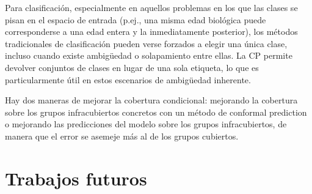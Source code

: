 Para clasificación, especialmente en aquellos problemas en los que las clases se pisan en el espacio de entrada (p.ej., una misma edad biológica puede corresponderse a una edad entera y la inmediatamente posterior), los métodos tradicionales de clasificación pueden verse forzados a elegir una única clase, incluso cuando existe ambigüedad o solapamiento entre ellas. La CP permite devolver conjuntos de clases en lugar de una sola etiqueta, lo que es particularmente útil en estos escenarios de ambigüedad inherente.

Hay dos maneras de mejorar la cobertura condicional: mejorando la cobertura sobre los grupos infracubiertos concretos con un método de conformal prediction o mejorando las predicciones del modelo sobre los grupos infracubiertos, de manera que el error se asemeje más al de los grupos cubiertos. 




\section{Trabajos futuros}



